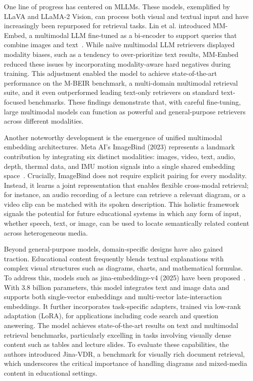 One line of progress has centered on MLLMs. These models, exemplified by LLaVA and LLaMA-2 Vision, can process both visual and textual input and have increasingly been repurposed for retrieval tasks. Lin et al. introduced MM-Embed, a multimodal LLM fine-tuned as a bi-encoder to support queries that combine images and text~\cite{lin2024mmembed}. While naïve multimodal LLM retrievers displayed modality biases, such as a tendency to over-prioritize text results, MM-Embed reduced these issues by incorporating modality-aware hard negatives during training. This adjustment enabled the model to achieve state-of-the-art performance on the M-BEIR benchmark, a multi-domain multimodal retrieval suite, and it even outperformed leading text-only retrievers on standard text-focused benchmarks. These findings demonstrate that, with careful fine-tuning, large multimodal models can function as powerful and general-purpose retrievers across different modalities.

Another noteworthy development is the emergence of unified multimodal embedding architectures. Meta AI’s ImageBind (2023) represents a landmark contribution by integrating six distinct modalities: images, video, text, audio, depth, thermal data, and IMU motion signals into a single shared embedding space~\cite{girdhar2023imagebind}. Crucially, ImageBind does not require explicit pairing for every modality. Instead, it learns a joint representation that enables flexible cross-modal retrieval; for instance, an audio recording of a lecture can retrieve a relevant diagram, or a video clip can be matched with its spoken description. This holistic framework signals the potential for future educational systems in which any form of input, whether speech, text, or image, can be used to locate semantically related content across heterogeneous media.

Beyond general-purpose models, domain-specific designs have also gained traction. Educational content frequently blends textual explanations with complex visual structures such as diagrams, charts, and mathematical formulas. To address this, models such as jina-embeddings-v4 (2025) have been proposed~\cite{guenther2025jinaembeddingsv4}. With 3.8 billion parameters, this model integrates text and image data and supports both single-vector embeddings and multi-vector late-interaction embeddings. It further incorporates task-specific adapters, trained via low-rank adaptation (LoRA), for applications including code search and question answering. The model achieves state-of-the-art results on text and multimodal retrieval benchmarks, particularly excelling in tasks involving visually dense content such as tables and lecture slides. To evaluate these capabilities, the authors introduced Jina-VDR, a benchmark for visually rich document retrieval, which underscores the critical importance of handling diagrams and mixed-media content in educational settings.

